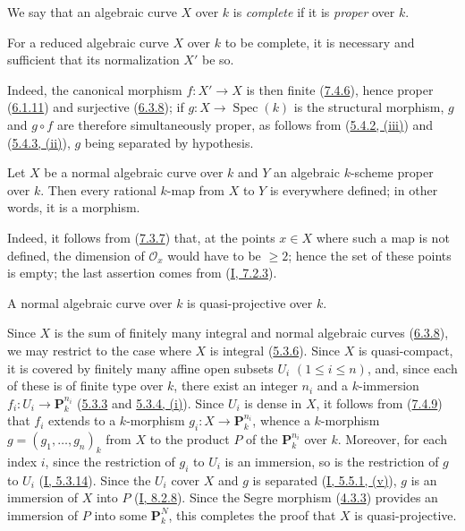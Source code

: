 \begin{env}[7.4.7]
\label{II.7.4.7}
We say that an algebraic curve $X$ over $k$ is \emph{complete} if it is
\emph{proper} over $k$.
\end{env}

\begin{corollary}[7.4.8]
\label{II.7.4.8}
For a reduced algebraic curve $X$ over $k$ to be complete, it is necessary and
sufficient that its normalization $X'$ be so.
\end{corollary}

Indeed, the canonical morphism $f:X'\to X$ is then finite
(\hyperref[II.7.4.6]{7.4.6}), hence proper
(\hyperref[II.6.1.11]{6.1.11}) and surjective
(\hyperref[II.6.3.8]{6.3.8}); if $g:X\to\operatorname{Spec}(k)$ is the
structural morphism, $g$ and $g\circ f$ are therefore simultaneously proper,
as follows from (\hyperref[II.5.4.2]{5.4.2, (iii)}) and
(\hyperref[II.5.4.3]{5.4.3, (ii)}), $g$ being separated by hypothesis.

\begin{proposition}[7.4.9]
\label{II.7.4.9}
Let $X$ be a normal algebraic curve over $k$ and $Y$ an algebraic $k$-scheme
proper over $k$. Then every rational $k$-map from $X$ to $Y$ is
everywhere defined; in other words, it is a morphism.
\end{proposition}

Indeed, it follows from (\hyperref[II.7.3.7]{7.3.7}) that, at the points
$x\in X$ where such a map is not defined, the dimension of $\mathcal{O}_x$
would have to be $\geq2$; hence the set of these points is empty; the last
assertion comes from (\hyperref[I.7.2.3]{I, 7.2.3}).

\begin{corollary}[7.4.10]
\label{II.7.4.10}
A normal algebraic curve over $k$ is quasi-projective over $k$.
\end{corollary}

Since $X$ is the sum of finitely many integral and normal algebraic curves
(\hyperref[II.6.3.8]{6.3.8}), we may restrict to the case where $X$ is
integral (\hyperref[II.5.3.6]{5.3.6}). Since $X$ is quasi-compact, it is
covered by finitely many affine open subsets $U_i$ $(1\leq i\leq n)$, and,
since each of these is of finite type over $k$, there exist an integer
$n_i$ and a $k$-immersion $f_i:U_i\to\mathbf{P}_k^{n_i}$
(\hyperref[II.5.3.3]{5.3.3} and
\hyperref[II.5.3.4]{5.3.4, (i)}). Since $U_i$ is dense in $X$, it follows
from (\hyperref[II.7.4.9]{7.4.9}) that $f_i$ extends to a $k$-morphism
$g_i:X\to\mathbf{P}_k^{n_i}$, whence a $k$-morphism
$g=(g_1,\ldots,g_n)_k$ from $X$ to the product $P$ of the
$\mathbf{P}_k^{n_i}$ over $k$. Moreover, for each index $i$, since the
restriction of $g_i$ to $U_i$ is an immersion, so is the restriction of $g$ to
$U_i$ (\hyperref[I.5.3.14]{I, 5.3.14}). Since the
$U_i$ cover $X$ and $g$ is separated
(\hyperref[I.5.5.1]{I, 5.5.1, (v)}), $g$ is an immersion of $X$ into $P$
(\hyperref[I.8.2.8]{I, 8.2.8}). Since the Segre morphism
(\hyperref[II.4.3.3]{4.3.3}) provides an immersion of $P$ into some
$\mathbf{P}_k^N$, this completes the proof that $X$ is quasi-projective.

